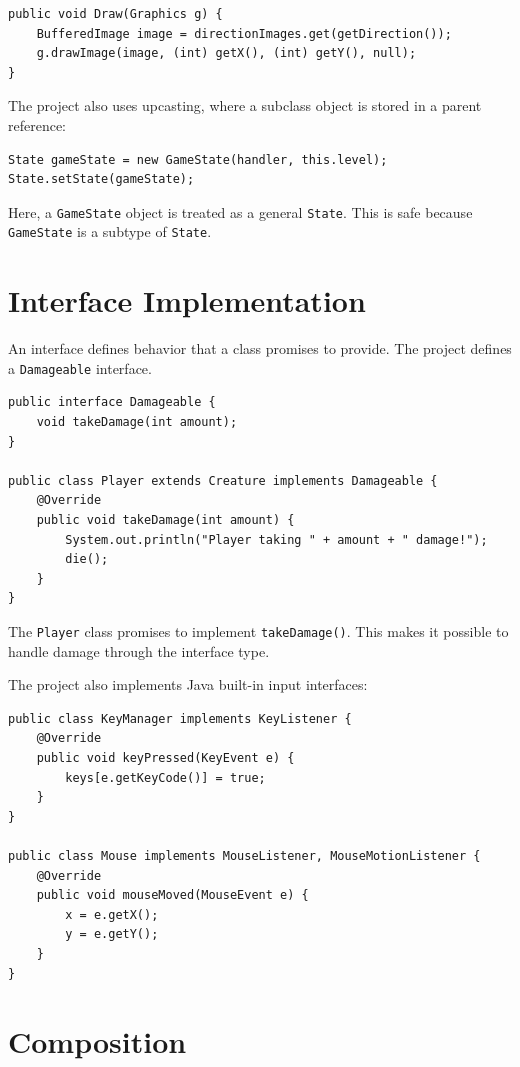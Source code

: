 \documentclass[12pt,a4paper]{article}
\begin{document}
\begin{lstlisting}
public void Draw(Graphics g) {
    BufferedImage image = directionImages.get(getDirection());
    g.drawImage(image, (int) getX(), (int) getY(), null);
}
\end{lstlisting}

The project also uses upcasting, where a subclass object is stored in a parent reference:

\begin{lstlisting}
State gameState = new GameState(handler, this.level);
State.setState(gameState);
\end{lstlisting}

Here, a \texttt{GameState} object is treated as a general \texttt{State}. This is safe because \texttt{GameState} is a subtype of \texttt{State}.

\section{Interface Implementation}

An interface defines behavior that a class promises to provide. The project defines a \texttt{Damageable} interface.

\begin{lstlisting}
public interface Damageable {
    void takeDamage(int amount);
}

public class Player extends Creature implements Damageable {
    @Override
    public void takeDamage(int amount) {
        System.out.println("Player taking " + amount + " damage!");
        die();
    }
}
\end{lstlisting}

The \texttt{Player} class promises to implement \texttt{takeDamage()}. This makes it possible to handle damage through the interface type.

The project also implements Java built-in input interfaces:

\begin{lstlisting}
public class KeyManager implements KeyListener {
    @Override
    public void keyPressed(KeyEvent e) {
        keys[e.getKeyCode()] = true;
    }
}

public class Mouse implements MouseListener, MouseMotionListener {
    @Override
    public void mouseMoved(MouseEvent e) {
        x = e.getX();
        y = e.getY();
    }
}
\end{lstlisting}

\section{Composition}
\end{document}

